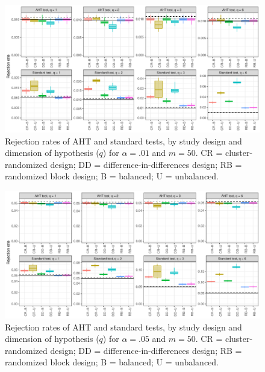 \documentclass[12pt]{article}
\begin{document}
\begin{landscape}
\begin{figure}[p]
{\centering \includegraphics[width=\linewidth]{CR_fig/balance_01_50-1} 

}

\caption{Rejection rates of AHT and standard tests, by study design and dimension of hypothesis ($q$) for $\alpha = .01$ and $m = 50$. CR = cluster-randomized design; DD = difference-in-differences design; RB = randomized block design; B = balanced; U = unbalanced.}\label{fig:balance_01_50}
\end{figure}

\begin{figure}[p]

{\centering \includegraphics[width=\linewidth]{CR_fig/balance_05_50-1} 

}

\caption{Rejection rates of AHT and standard tests, by study design and dimension of hypothesis ($q$) for $\alpha = .05$ and $m = 50$. CR = cluster-randomized design; DD = difference-in-differences design; RB = randomized block design; B = balanced; U = unbalanced.}\label{fig:balance_05_50}
\end{figure}

\begin{figure}[p]


\end{figure}
\end{landscape}
\end{document}
